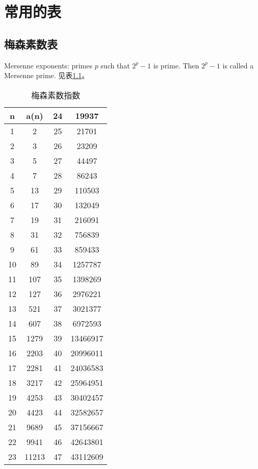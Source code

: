 \chapter{常用的表}


\section{梅森素数表}
Mersenne exponents: primes $p$ such that $2^p - 1$ is prime. Then $2^p - 1$ is called a Mersenne prime.
见表\ref{tab:Mersenne-prime}。
\begin{table}[!htbp]
\centering
\caption{梅森素数指数 \label{tab:Mersenne-prime}}
\begin{tabular}{|c|c|c|c|}
\hline
n  & a(n)  & 24 & 19937    \\ \hline
1  & 2     & 25 & 21701    \\ \hline
2  & 3     & 26 & 23209    \\ \hline
3  & 5     & 27 & 44497    \\ \hline
4  & 7     & 28 & 86243    \\ \hline
5  & 13    & 29 & 110503   \\ \hline
6  & 17    & 30 & 132049   \\ \hline
7  & 19    & 31 & 216091   \\ \hline
8  & 31    & 32 & 756839   \\ \hline
9  & 61    & 33 & 859433   \\ \hline
10 & 89    & 34 & 1257787  \\ \hline
11 & 107   & 35 & 1398269  \\ \hline
12 & 127   & 36 & 2976221  \\ \hline
13 & 521   & 37 & 3021377  \\ \hline
14 & 607   & 38 & 6972593  \\ \hline
15 & 1279  & 39 & 13466917 \\ \hline
16 & 2203  & 40 & 20996011 \\ \hline
17 & 2281  & 41 & 24036583 \\ \hline
18 & 3217  & 42 & 25964951 \\ \hline
19 & 4253  & 43 & 30402457 \\ \hline
20 & 4423  & 44 & 32582657 \\ \hline
21 & 9689  & 45 & 37156667 \\ \hline
22 & 9941  & 46 & 42643801 \\ \hline
23 & 11213 & 47 & 43112609 \\ \hline
\end{tabular}
\end{table}


